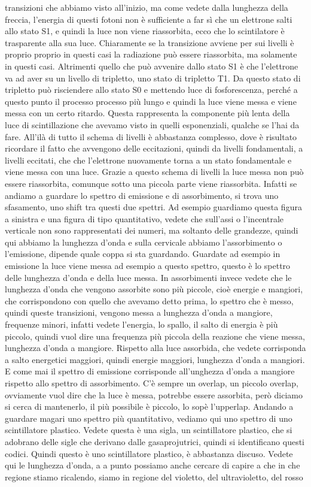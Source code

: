 {transizioni che abbiamo visto all'inizio, ma come vedete dalla lunghezza della freccia, l'energia di questi fotoni non è sufficiente a far sì che un elettrone salti allo stato S1, e quindi la luce non viene riassorbita, ecco che lo scintilatore è trasparente alla sua luce. Chiaramente se la transizione avviene per sui livelli è proprio proprio in questi casi la radiazione può essere riassorbita, ma solamente in questi casi. Altrimenti quello che può avvenire dallo stato S1 è che l'elettrone va ad aver su un livello di tripletto, uno stato di tripletto T1. Da questo stato di tripletto può risciendere allo stato S0 e mettendo luce di fosforescenza, perché a questo punto il processo processo più lungo e quindi la luce viene messa e viene messa con un certo ritardo. Questa rappresenta la componente più lenta della luce di scintillazione che avevamo visto in quelli esponenziali, qualche se l'hai da fare. All'ilà di tutto il schema di livelli è abbastanza complesso, dove è risultato ricordare il fatto che avvengono delle eccitazioni, quindi da livelli fondamentali, a livelli eccitati, che che l'elettrone nuovamente torna a un stato fondamentale e viene messa con una luce. Grazie a questo schema di livelli la luce messa non può essere riassorbita, comunque sotto una piccola parte viene riassorbita. Infatti se andiamo a guardare lo spettro di emissione e di assorbimento, si trova uno sfasamento, uno shift tra questi due spettri. Ad esempio guardiamo questa figura a sinistra e una figura di tipo quantitativo, vedete che sull'assi o l'incentrale verticale non sono rappresentati dei numeri, ma soltanto delle grandezze, quindi qui abbiamo la lunghezza d'onda e sulla cervicale abbiamo l'assorbimento o l'emissione, dipende quale coppa si sta guardando. Guardate ad esempio in emissione la luce viene messa ad esempio a questo spettro, questo è lo spettro delle lunghezza d'onda e della luce messa. In assorbimenti invece vedete che le lunghezza d'onda che vengono assorbite sono più piccole, cioè energie e mangiori, che corrispondono con quello che avevamo detto prima, lo spettro che è messo, quindi queste transizioni, vengono messa a lunghezza d'onda a mangiore, frequenze minori, infatti vedete l'energia, lo spallo, il salto di energia è più piccolo, quindi vuol dire una frequenza più piccola della reazione che viene messa, lunghezza d'onda a mangiore. Rispetto alla luce assorbida, che vedete corrisponda a salto energetici maggiori, quindi energie maggiori, lunghezza d'onda a mangiori. E come mai il spettro di emissione corrisponde all'unghezza d'onda a mangiore rispetto allo spettro di assorbimento. C'è sempre un overlap, un piccolo overlap, ovviamente vuol dire che la luce è messa, potrebbe essere assorbita, però diciamo si cerca di mantenerlo, il più possibile è piccolo, lo sopè l'upperlap. Andando a guardare magari uno spettro più quantitativo, vediamo qui uno spettro di uno scintillatore plastico. Vedete questa è una sigla, un scintillatore plastico, che si adobrano delle sigle che derivano dalle gasaprojutrici, quindi si identificano questi codici. Quindi questo è uno scintillatore plastico, è abbastanza discuso. Vedete qui le lunghezza d'onda, a a punto possiamo anche cercare di capire a che in che regione stiamo ricalendo, siamo in regione del violetto, del ultravioletto, del rosso }
